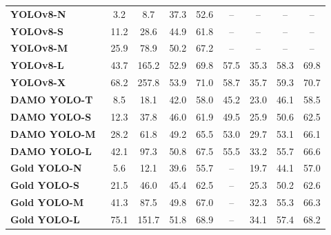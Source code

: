\documentclass[10pt,twocolumn,letterpaper]{article}
\begin{document}
\begin{table}[t]
\begin{threeparttable}[t]
\begin{tabular}{lcccccccc}
				\midrule
				\textbf{YOLOv8-N~\cite{glenn2024yolov8}} & 3.2 & 8.7 & 37.3 & 52.6 & -- & -- & -- & -- \\
				\textbf{YOLOv8-S~\cite{glenn2024yolov8}} & 11.2 & 28.6 & 44.9 & 61.8 & -- & -- & -- & -- \\
				\textbf{YOLOv8-M~\cite{glenn2024yolov8}} & 25.9 & 78.9 & 50.2 & 67.2 & -- & -- & -- & -- \\
				\textbf{YOLOv8-L~\cite{glenn2024yolov8}} & 43.7 & 165.2 & 52.9 & 69.8 & 57.5 & 35.3 & 58.3 & 69.8 \\
				\textbf{YOLOv8-X~\cite{glenn2024yolov8}} & 68.2 & 257.8 & 53.9 & 71.0 & 58.7 & 35.7 & 59.3 & 70.7 \\
				\midrule
				\textbf{DAMO YOLO-T~\cite{xu2022damo}} & 8.5 & 18.1 & 42.0 & 58.0 & 45.2 & 23.0 & 46.1 & 58.5 \\
				\textbf{DAMO YOLO-S~\cite{xu2022damo}} & 12.3 & 37.8 & 46.0 & 61.9 & 49.5 & 25.9 & 50.6 & 62.5 \\
				\textbf{DAMO YOLO-M~\cite{xu2022damo}} & 28.2 & 61.8 & 49.2 & 65.5 & 53.0 & 29.7 & 53.1 & 66.1 \\
				\textbf{DAMO YOLO-L~\cite{xu2022damo}} & 42.1 & 97.3 & 50.8 & 67.5 & 55.5 & 33.2 & 55.7 & 66.6 \\
				\midrule
				\textbf{Gold YOLO-N~\cite{wang2023gold}} & 5.6 & 12.1 & 39.6 & 55.7 & -- & 19.7 & 44.1 & 57.0 \\
				\textbf{Gold YOLO-S~\cite{wang2023gold}} & 21.5 & 46.0 & 45.4 & 62.5 & -- & 25.3 & 50.2 & 62.6 \\
				\textbf{Gold YOLO-M~\cite{wang2023gold}} & 41.3 & 87.5 & 49.8 & 67.0 & -- & 32.3 & 55.3 & 66.3 \\
				\textbf{Gold YOLO-L~\cite{wang2023gold}} & 75.1 & 151.7 & 51.8 & 68.9 & -- & 34.1 & 57.4 & 68.2 \\

\end{tabular}
\end{threeparttable}
\end{table}
\end{document}
